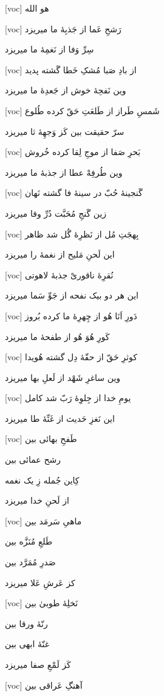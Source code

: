\documentclass[11pt]{article}
\newenvironment{orig}
  {\begin{farsi}[voc]}
  {\end{farsi}}
\newenvironment{word}{}{}
\newcommand{\ayat}[1]{\vspace{4ex}\begin{orig}#1\end{orig}}
\begin{document}
\fontsize{24}{32}

\thispagestyle{empty}

\begin{word}
\ayat{
هو الله
}

\ayat{
رَشحِ عَما از جَذبِۀ ما میریزد

سِرِّ وَفا از نَغمِۀ ما میریزد
}

\ayat{
از بادِ صَبا مُشکِ خَطا گَشته پدید

وین نَفحِۀ خوش از جَعدِۀ ما میریزد
}

\ayat{
شَمسِ طَراز از طَلعَتِ حَقّ کرده طُلوع

سرّ حقیقت بین کَز وَجهِۀ ثا میریزد
}

\ayat{
بَحرِ صَفا از موجِ لِقا کرده خُروش

وین طُرفِهْ عطا از جذبۀ ما میریزد
}

\ayat{
گَنجینۀ حُبّ در سینۀ فا گشته نَهان

زین گَنجِ مُحَبَّت دُرِّ وفا ميريزد
}

\ayat{
بِهجَتِ مُل از نَظرِۀ گُل شد ظاهر

این لَحنِ مَلیح از نغمۀ را میریزد
}

\ayat{
نُقرِۀ ناقوریْ جذبۀ لاهوتی

این هر دو بیک نفحه از جَوِّ سَما میریزد
}

\ayat{
دَورِ اَنَا هُو از چِهرِۀ ما کرده بُروز

کَورِ هُوَ هُو از طفحۀ ما میریزد
}

\ayat{
کوثرِ حَقّ از حقّۀ دِل گشته هُویدا

وین ساغرِ شَهْد از لَعلِ بها میریزد
}

\ayat{
یومِ خدا از جِلوِۀ رَبّ شد کامل

این نَغزِ حَدیث از غَنِّۀ طا میریزد
}

\ayat{
طَفحِ بهائی بین

رشح عمائی بین

کِاین جُمله زِ یک نغمه

از لَحنِ خدا میریزد
}

\ayat{
ماهیِ سَرمَد بین

طَلعِ مُنَزَّه بین

صَدرِ مُمَرَّد بین

کز عَرشِ عَلا میریزد
}

\ayat{
نَخلِۀ طوبیٰ بین

رنّۀ ورقا بین

غنّۀ ابهی بین

کَز لَمْعِ صفا میریزد
}

\ayat{
آهنگِ عَراقی بین

}
\end{word}
\end{document}
